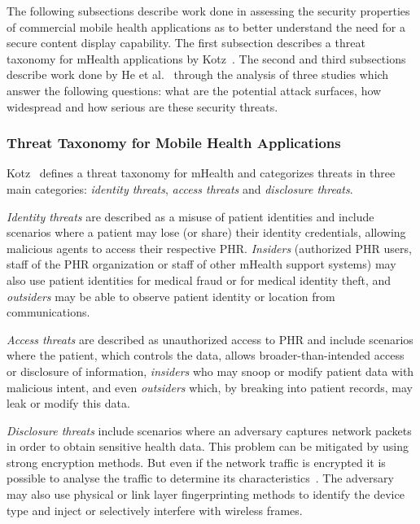 The following subsections describe work done in assessing the security properties of commercial mobile health applications as to better understand the need for a secure content display capability. The first subsection describes a threat taxonomy for mHealth applications by Kotz~\cite{kotz2011threat}. The second and third subsections describe work done by He et al.~\cite{he2014security} through the analysis of three studies which answer the following questions: what are the potential attack surfaces, how widespread and how serious are these security threats.

\subsubsection{Threat Taxonomy for Mobile Health Applications}

Kotz~\cite{kotz2011threat} defines a threat taxonomy for mHealth and categorizes threats in three main categories: \emph{identity threats}, \emph{access threats} and \emph{disclosure threats}.

\emph{Identity threats} are described as a misuse of patient identities and include scenarios where a patient may lose (or share) their identity credentials, allowing malicious agents to access their respective \ac{PHR}. \emph{Insiders} (authorized \ac{PHR} users, staff of the \ac{PHR} organization or staff of other mHealth support systems) may also use patient identities for medical fraud or for medical identity theft, and \emph{outsiders} may be able to observe patient identity or location from communications.

\emph{Access threats} are described as unauthorized access to \ac{PHR} and include scenarios where the patient, which controls the data, allows broader-than-intended access or disclosure of information, \emph{insiders} who may snoop or modify patient data with malicious intent, and even \emph{outsiders} which, by breaking into patient records, may leak or modify this data.

\emph{Disclosure threats} include scenarios where an adversary captures network packets in order to obtain sensitive health data. This problem can be mitigated by using strong encryption methods. But even if the network traffic is encrypted it is possible to analyse the traffic to determine its characteristics~\cite{wright2006inferring}. The adversary may also use physical or link layer fingerprinting methods to identify the device type and inject or selectively interfere with wireless frames.

